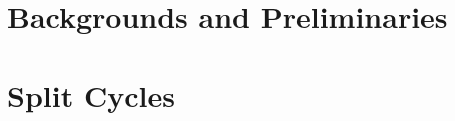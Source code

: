 \documentclass[a4paper,12pt,oneside]{book}
\begin{document}
\tableofcontents

\part{Backgrounds and Preliminaries}







\part{Split Cycles}





\printbibliography
\end{document}
